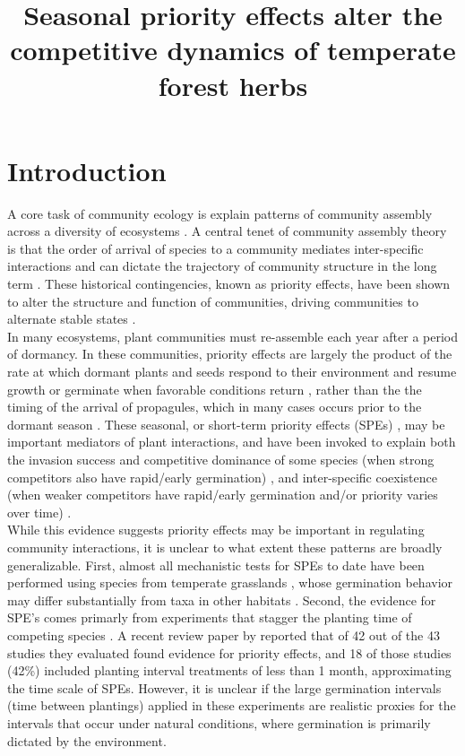 \documentclass[11pt]{article}\usepackage[]{graphicx}\usepackage[]{color}
\title{Seasonal priority effects alter the competitive dynamics of temperate forest herbs }
\begin{document}
\maketitle


\section*{Introduction}
\noindent A core task of community ecology is explain patterns of community assembly across a diversity of ecosystems \citep{Weiher:2011aa}. A central tenet of community assembly theory is that the order of arrival of species to a community mediates inter-specific interactions and can dictate the trajectory of community structure in the long term \citep{Fukami2015}. These historical contingencies, known as priority effects, have been shown to alter the structure and function of communities, driving communities to alternate stable states \citep{Fukami2011}.\\

\noindent In many ecosystems, plant communities must re-assemble each year after a period of dormancy. In these communities, priority effects are largely the product of the rate at which dormant plants and seeds respond to their environment and resume growth or germinate when favorable conditions return \citep{Rudolf:2019aa}, rather than the the timing of the arrival of propagules, which in many cases occurs prior to the dormant season \citep{Howe:1982aa,Baskin:1988aa}.  These seasonal, or short-term priority effects (SPEs) \citep{Wainwright_2011,Young:2017aa}, may be important mediators of plant interactions, and have been invoked to explain both the invasion success and competitive dominance of some species (when strong competitors also have rapid/early germination) \citep{Gioria2018}, and inter-specific coexistence (when weaker competitors have rapid/early germination and/or priority varies over time) \citep{Towers:2020aa}.\\

\noident While this evidence suggests priority effects may be important in regulating community interactions, it is unclear to what extent these patterns are broadly generalizable. First, almost all mechanistic tests for SPEs to date have been performed using species from temperate grasslands \citep{Weidlich:2020aa}, whose germination behavior may differ substantially from taxa in other habitats \citep{Tudela-Isanta:2018aa}. Second, the evidence for SPE's comes primarly from experiments that stagger the planting time of competing species \citep{Young:2017aa,Letten:2018aa}. A recent review paper by \citet{Weidlich:2020aa} reported that of 42 out of the 43 studies they evaluated found evidence for priority effects, and 18 of those studies (42\%) included planting interval treatments of less than 1 month, approximating the time scale of SPEs. However, it is unclear if the large germination intervals (time between plantings) applied in these experiments are realistic proxies for the intervals that occur under natural conditions, where germination is primarily dictated by the environment.\\
\end{document}
